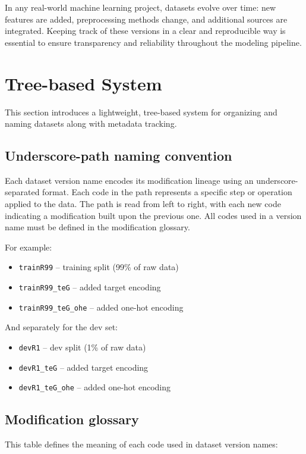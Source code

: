\documentclass[12pt,openany]{book}
\begin{document}
In any real-world machine learning project, datasets evolve over time: new features are added, preprocessing methods change, and additional sources are integrated. Keeping track of these versions in a clear and reproducible way is essential to ensure transparency and reliability throughout the modeling pipeline.



\section{Tree-based System}

This section introduces a lightweight, tree-based system for organizing and naming datasets along with metadata tracking. 


\subsection{Underscore-path naming convention}

Each dataset version name encodes its modification lineage using an underscore-separated format. Each code in the path represents a specific step or operation applied to the data. The path is read from left to right, with each new code indicating a modification built upon the previous one. All codes used in a version name must be defined in the modification glossary.
\newline

For example:

\begin{itemize}
    \item \texttt{trainR99} -- training split (99\% of raw data)
    \item \texttt{trainR99\_teG} -- added target encoding
    \item \texttt{trainR99\_teG\_ohe} -- added one-hot encoding
\end{itemize}

And separately for the dev set:

\begin{itemize}
    \item \texttt{devR1} -- dev split (1\% of raw data)
    \item \texttt{devR1\_teG} -- added target encoding
    \item \texttt{devR1\_teG\_ohe} -- added one-hot encoding
\end{itemize}




\subsection{Modification glossary}
This table defines the meaning of each code used in dataset version names:
\newline
\end{document}
